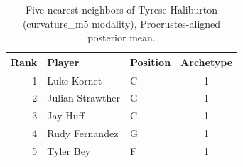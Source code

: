 \begin{table}[htbp]
  \centering\small
  \begin{tabular}{rllc}
    \toprule
    Rank & Player & Position & Archetype \\
    \midrule
    1 & Luke Kornet & C & 1 \\
    2 & Julian Strawther & G & 1 \\
    3 & Jay Huff & C & 1 \\
    4 & Rudy Fernandez & G & 1 \\
    5 & Tyler Bey & F & 1 \\
    \bottomrule
  \end{tabular}
  \caption{Five nearest neighbors of Tyrese Haliburton (curvature_m5 modality), Procrustes-aligned posterior mean.}
  \label{tab:Tyrese_Haliburton_neighbors_curvature_m5}
\end{table}

